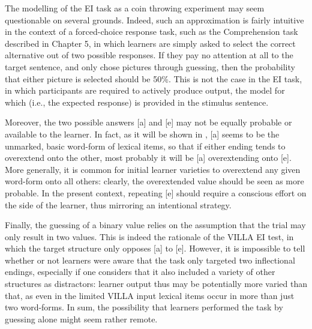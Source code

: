 The modelling of the EI task as a coin throwing experiment may seem questionable on several grounds. Indeed, such an approximation is fairly intuitive in the context of a forced-choice response task, such as the Comprehension task described in Chapter 5, in which learners are simply asked to select the correct alternative out of two possible responses. If they pay no attention at all to the target sentence, and only chose pictures through guessing, then the probability that either picture is selected should be 50\%. This is not the case in the EI task, in which participants are required to actively produce output, the model for which (i.e., the expected response) is provided in the stimulus sentence. 

Moreover, the two possible answers [a] and [e] may not be equally probable or available to the learner. In fact, as it will be shown in , [a] seems to be the unmarked, basic word-form of lexical items, so that if either ending tends to overextend onto the other, most probably it will be [a] overextending onto [e]. More generally, it is common for initial learner varieties to overextend any given word-form onto all others: clearly, the overextended value should be seen as more probable. In the present context, repeating [e] should require a conscious effort on the side of the learner, thus mirroring an intentional strategy.

Finally, the guessing of a binary value relies on the assumption that the trial may only result in two values. This is indeed the rationale of the VILLA EI test, in which the target structure only opposes [a] to [e]. However, it is impossible to tell whether or not learners were aware that the task only targeted two inflectional endings, especially if one considers that it also included a variety of other structures as distractors: learner output thus may be potentially more varied than that, as even in the limited VILLA input lexical items occur in more than just two word-forms. In sum, the possibility that learners performed the task by guessing alone might seem rather remote.

